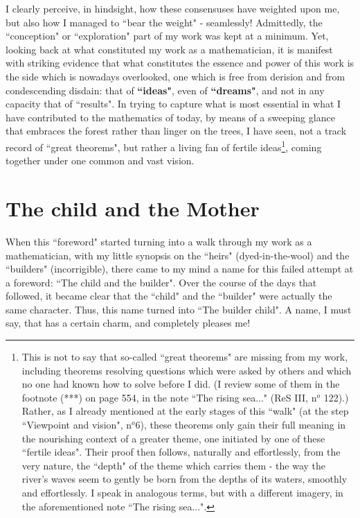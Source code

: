 I clearly perceive, in hindsight, how these consensuses have weighted upon me, but also how I managed to ``bear the weight" - seamlessly! Admittedly, the ``conception" or ``exploration" part of my work was kept at a minimum. Yet, looking back at what constituted my work as a mathematician, it is manifest with striking evidence that what constitutes the essence and power of this work is the side which is nowadays overlooked, one which is free from derision and from condescending disdain: that of \textbf{``ideas"}, even of \textbf{``dreams"}, and not in any capacity that of ``results". In trying to capture what is most essential in what I have contributed to the mathematics of today, by means of a sweeping glance that embraces the forest rather than linger on the trees, I have seen, not a track record of ``great theorems", but rather a living fan of fertile ideas\footnote{This is not to say that so-called ``great theorems" are missing from my work, including theorems resolving questions which were asked by others and which no one had known how to solve before I did. (I review some of them in the footnote (***) on page 554, in the note ``The rising sea..." (ReS III, n$^o$ 122).) Rather, as I already mentioned at the early stages of this ``walk"   (at the step ``Viewpoint and vision", n$^o$6), these theorems only gain their full meaning in the nourishing context of a greater theme, one initiated by one of these ``fertile ideas". Their proof then follows, naturally and effortlessly, from the very nature, the ``depth" of the theme which carries them - the way the river's waves seem to gently be born from the depths of its waters, smoothly and effortlessly. I speak in analogous terms, but with a different imagery, in the aforementioned note ``The rising sea...".}, coming together under one common and vast vision.

\section{The child and the Mother}

When this ``foreword" started turning into a walk through my work as a mathematician, with my little synopsis on the ``heirs" (dyed-in-the-wool) and the ``builders" (incorrigible), there came to my mind a name for this failed attempt at a foreword: ``The child and the builder". Over the course of the days that followed, it became clear that the ``child" and the ``builder" were actually the same character. Thus, this name turned into ``The builder child". A name, I must say, that has a certain charm, and completely pleases me!

